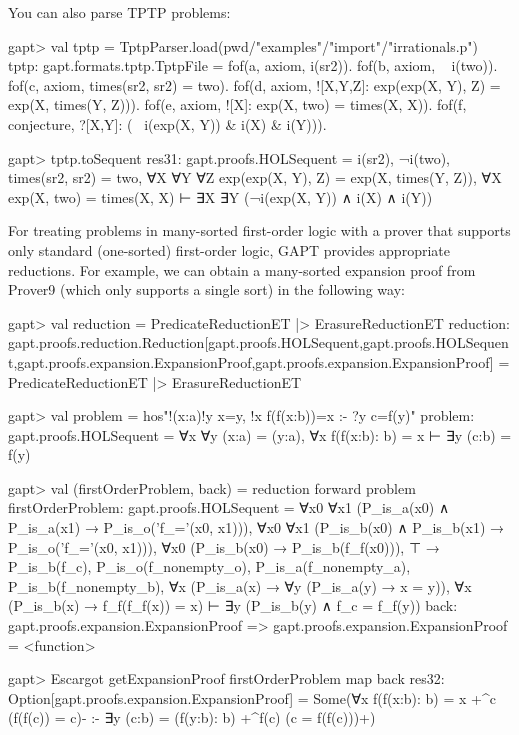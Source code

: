 \documentclass[a4paper,11pt]{book}
\begin{document}
You can also parse TPTP problems:
\begin{clilisting}
gapt> val tptp = TptpParser.load(pwd/"examples"/"import"/"irrationals.p")
tptp: gapt.formats.tptp.TptpFile =
fof(a, axiom, i(sr2)).
fof(b, axiom, ~ i(two)).
fof(c, axiom, times(sr2, sr2) = two).
fof(d, axiom, ![X,Y,Z]: exp(exp(X, Y), Z) = exp(X, times(Y, Z))).
fof(e, axiom, ![X]: exp(X, two) = times(X, X)).
fof(f, conjecture, ?[X,Y]: (~ i(exp(X, Y)) & i(X) & i(Y))).

gapt> tptp.toSequent
res31: gapt.proofs.HOLSequent =
i(sr2),
¬i(two),
times(sr2, sr2) = two,
∀X ∀Y ∀Z exp(exp(X, Y), Z) = exp(X, times(Y, Z)),
∀X exp(X, two) = times(X, X)
⊢
∃X ∃Y (¬i(exp(X, Y)) ∧ i(X) ∧ i(Y))

\end{clilisting}

For treating problems in many-sorted first-order logic with a prover that supports only
standard (one-sorted) first-order logic, GAPT provides appropriate reductions.
For example, we can obtain a many-sorted expansion proof from Prover9
(which only supports a single sort) in the following way:
\begin{clilisting}
gapt> val reduction = PredicateReductionET |> ErasureReductionET
reduction: gapt.proofs.reduction.Reduction[gapt.proofs.HOLSequent,gapt.proofs.HOLSequent,gapt.proofs.expansion.ExpansionProof,gapt.proofs.expansion.ExpansionProof] = PredicateReductionET |> ErasureReductionET

gapt> val problem = hos"!(x:a)!y x=y, !x f(f(x:b))=x :- ?y c=f(y)"
problem: gapt.proofs.HOLSequent = ∀x ∀y (x:a) = (y:a), ∀x f(f(x:b): b) = x ⊢ ∃y (c:b) = f(y)

gapt> val (firstOrderProblem, back) = reduction forward problem
firstOrderProblem: gapt.proofs.HOLSequent =
∀x0 ∀x1 (P_is_a(x0) ∧ P_is_a(x1) → P_is_o('f_='(x0, x1))),
∀x0 ∀x1 (P_is_b(x0) ∧ P_is_b(x1) → P_is_o('f_='(x0, x1))),
∀x0 (P_is_b(x0) → P_is_b(f_f(x0))),
⊤ → P_is_b(f_c),
P_is_o(f_nonempty_o),
P_is_a(f_nonempty_a),
P_is_b(f_nonempty_b),
∀x (P_is_a(x) → ∀y (P_is_a(y) → x = y)),
∀x (P_is_b(x) → f_f(f_f(x)) = x)
⊢
∃y (P_is_b(y) ∧ f_c = f_f(y))
back: gapt.proofs.expansion.ExpansionProof => gapt.proofs.expansion.ExpansionProof = <function>

gapt> Escargot getExpansionProof firstOrderProblem map back
res32: Option[gapt.proofs.expansion.ExpansionProof] =
Some(∀x f(f(x:b): b) = x +^{c} (f(f(c)) = c)-
:-
∃y (c:b) = (f(y:b): b) +^{f(c)} (c = f(f(c)))+)

\end{clilisting}
\end{document}

